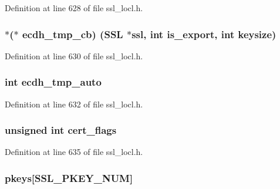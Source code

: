 Definition at line 628 of file ssl\+\_\+locl.\+h.

\subsubsection[{\texorpdfstring{ecdh\+\_\+tmp\+\_\+cb}{ecdh_tmp_cb}}]{$\ast$($\ast$ ecdh\+\_\+tmp\+\_\+cb) ({\bf S\+SL} $\ast$ssl, int is\+\_\+export, int keysize)}\hypertarget{structcert__st_afe34942adba04c0132ab8227b87708b4}{}\label{structcert__st_afe34942adba04c0132ab8227b87708b4}


Definition at line 630 of file ssl\+\_\+locl.\+h.

\subsubsection[{\texorpdfstring{ecdh\+\_\+tmp\+\_\+auto}{ecdh_tmp_auto}}]{\setlength{\rightskip}{0pt plus 5cm}int ecdh\+\_\+tmp\+\_\+auto}\hypertarget{structcert__st_a03def639d744b387b29a3b62911e6eb4}{}\label{structcert__st_a03def639d744b387b29a3b62911e6eb4}


Definition at line 632 of file ssl\+\_\+locl.\+h.

\subsubsection[{\texorpdfstring{cert\+\_\+flags}{cert_flags}}]{\setlength{\rightskip}{0pt plus 5cm}unsigned int cert\+\_\+flags}\hypertarget{structcert__st_a09d39f5a90b93e151545c3615c41e2b7}{}\label{structcert__st_a09d39f5a90b93e151545c3615c41e2b7}


Definition at line 635 of file ssl\+\_\+locl.\+h.

\subsubsection[{\texorpdfstring{pkeys}{pkeys}}]{ pkeys\mbox{[}{\bf S\+S\+L\+\_\+\+P\+K\+E\+Y\+\_\+\+N\+UM}\mbox{]}}\hypertarget{structcert__st_aa3e7014f38763863265f61aac0a607e4}{}\label{structcert__st_aa3e7014f38763863265f61aac0a607e4}


